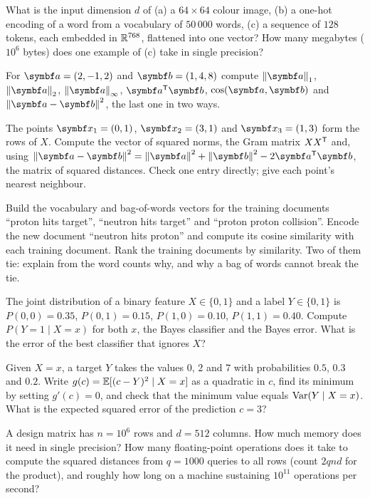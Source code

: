 \documentclass[11pt]{article}
\begin{document}
\begin{questions}
\begin{calculations}
\item What is the input dimension $d$ of (a) a $64 \times 64$ colour image, (b) a one-hot encoding of a word from a
vocabulary of $50\,000$ words, (c) a sequence of $128$ tokens, each embedded in $\mathbb{R}^{768}$, flattened into one vector?
How many megabytes ($10^6$ bytes) does one example of (c) take in single precision?
\item For $\vect{a} = (2, -1, 2)$ and $\vect{b} = (1, 4, 8)$ compute $\norm{\vect{a}}_1$, $\norm{\vect{a}}_2$,
$\norm{\vect{a}}_\infty$, $\vect{a}\T\vect{b}$, $\cos(\vect{a}, \vect{b})$ and $\norm{\vect{a} - \vect{b}}^2$, the last
one in two ways.
\item The points $\x_1 = (0, 1)$, $\x_2 = (3, 1)$ and $\x_3 = (1, 3)$ form the rows of $X$. Compute the vector of
squared norms, the Gram matrix $XX^{\mathsf{T}}$ and, using $\norm{\vect{a} - \vect{b}}^2 = \norm{\vect{a}}^2 +
\norm{\vect{b}}^2 - 2\vect{a}\T\vect{b}$, the matrix of squared distances. Check one entry directly; give each
point's nearest neighbour.
\item Build the vocabulary and bag-of-words vectors for the training documents ``proton hits target'', ``neutron hits
target'' and ``proton proton collision''. Encode the new document ``neutron hits proton'' and compute its cosine
similarity with each training document. Rank the training documents by similarity. Two of them tie: explain from the
word counts why, and why a bag of words cannot break the tie.
\item The joint distribution of a binary feature $X \in \{0, 1\}$ and a label $Y \in \{0, 1\}$ is $P(0, 0) = 0.35$,
$P(0, 1) = 0.15$, $P(1, 0) = 0.10$, $P(1, 1) = 0.40$. Compute $P(Y = 1 \mid X = x)$ for both $x$, the Bayes classifier
and the Bayes error. What is the error of the best classifier that ignores $X$?
\item Given $X = x$, a target $Y$ takes the values $0$, $2$ and $7$ with probabilities $0.5$, $0.3$ and $0.2$. Write
$g(c) = \mathbb{E}[(c - Y)^2 \mid X = x]$ as a quadratic in $c$, find its minimum by setting $g'(c) = 0$, and check that the
minimum value equals $\operatorname{Var}(Y \mid X = x)$. What is the expected squared error of the prediction $c = 3$?
\item A design matrix has $n = 10^6$ rows and $d = 512$ columns. How much memory does it need in single precision?
How many floating-point operations does it take to compute the squared distances from $q = 1000$ queries to all rows
(count $2qnd$ for the product), and roughly how long on a machine sustaining $10^{11}$ operations per second?
\end{calculations}


\end{questions}
\end{document}
